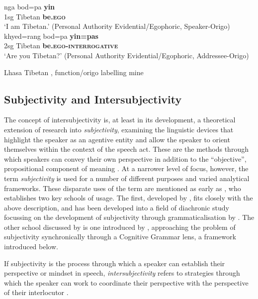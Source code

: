 \begin{exe}
\ex\label{ex:OrigoShift}
\begin{xlist}
\ex\label{ex:OrigoShift:a} 
\gll nga bod=pa \textbf{yin} \\ 
1sg Tibetan \textbf{be.\textsc{ego}} \\
\glt `I am Tibetan.' (Personal Authority Evidential/Egophoric, Speaker-Origo)
\ex\label{ex:OrigoShift:b} 
\gll khyed=rang bod=pa \textbf{yin=pas} \\
2sg Tibetan \textbf{be.\textsc{ego}-\textsc{interrogative}} \\
\glt `Are you Tibetan?' (Personal Authority Evidential/Egophoric, Addressee-Origo)
\end{xlist}
Lhasa Tibetan \cite[Tibetic: PRC,][394]{DeLancey2017Tibetan}, function/origo labelling mine
\end{exe}

\subsection{Subjectivity and Intersubjectivity}
The concept of intersubjectivity is, at least in its development, a theoretical extension of research into \textit{subjectivity}, examining the linguistic devices that highlight the speaker as an agentive entity and allow the speaker to orient themselves within the context of the speech act. These are the methods through which speakers can convey their own perspective in addition to the ``objective'', propositional component of meaning \cite{Finegan1995}. At a narrower level of focus, however, the term \textit{subjectivity} is used for a number of different purposes and varied analytical frameworks. These disparate uses of the term are mentioned as early as , who establishes two key schools of usage. The first, developed by , fits closely with the above description, and has been developed into a field of diachronic study focussing on the development of subjectivity through grammaticalisation by . The other school discussed by  is one introduced by , approaching the problem of subjectivity synchronically through a Cognitive Grammar lens, a framework introduced below.
    
If subjectivity is the process through which a speaker can establish their perspective or mindset in speech, \textit{intersubjectivity} refers to strategies through which the speaker can work to coordinate their perspective with the perspective of their interlocutor \cite{Brems2014}.

